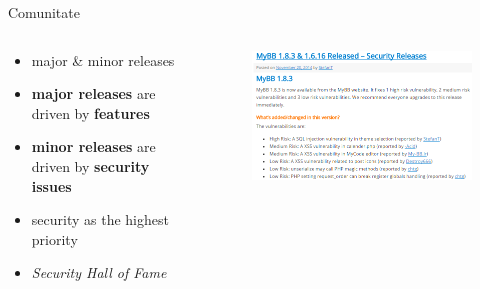 \documentclass[9pt]{beamer}
\begin{document}
\begin{frame}{Comunitate}
  \begin{columns}
    \begin{column}[c]{0.50\textwidth}
        \begin{itemize}
		\vskip10pt
		\item major \& minor releases
		\vskip10pt
		\item \textbf{major releases} are driven by \textbf{features}
		\vskip10pt
		\item \textbf{minor releases }are driven by \textbf{security issues}
		\vskip10pt
		\item security as the highest priority
		\vskip10pt
		\item \textit{Security Hall of Fame}
	\end{itemize}
    \end{column}
    \begin{column}[c]{0.50\textwidth}
      \begin{figure}
        \includegraphics[scale=0.5]{figures/screen1}
      \end{figure}
    \end{column}
  \end{columns}
\end{frame}
\end{document}
